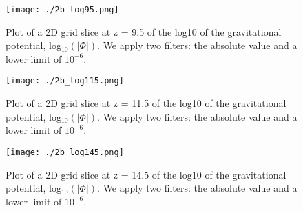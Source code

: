 \begin{figure}[h!]
  \centering
  \texttt{[image: ./2b\_log95.png]}
  \caption{Plot of a 2D grid slice at z = 9.5 of the log10 of the gravitational potential, log$_10(|\Phi|)$. We apply two filters: the absolute value and a lower limit of $10^{-6}$.}
\end{figure}

\begin{figure}[h!]
  \centering
  \texttt{[image: ./2b\_log115.png]}
  \caption{Plot of a 2D grid slice at z = 11.5 of the log10 of the gravitational potential, log$_10(|\Phi|)$. We apply two filters: the absolute value and a lower limit of $10^{-6}$.}
\end{figure}

\begin{figure}[h!]
  \centering
  \texttt{[image: ./2b\_log145.png]}
  \caption{Plot of a 2D grid slice at z = 14.5 of the log10 of the gravitational potential, log$_10(|\Phi|)$. We apply two filters: the absolute value and a lower limit of $10^{-6}$.}
\end{figure}

\clearpage












